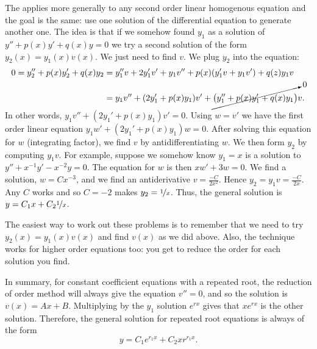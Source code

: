 The \emph{} applies more generally to any second order linear homogenous equation and the goal is the same: use one solution of the differential equation to generate another one.  The idea is that if we somehow found $y_1$ as a solution of
$y'' + p(x) y' + q(x) y = 0$ we try a second
solution of the form $y_2(x) = y_1(x) v(x)$.
We just need to find $v$.  We plug $y_2$ into the equation:
\begin{equation*}
\begin{split}
0 = 
y_2'' + p(x) y_2' + q(x) y_2 & =
y_1'' v + 2 y_1' v' + y_1 v''
+ p(x) ( y_1' v + y_1 v' )
+ q(z) y_1 v
\\
& =
y_1 v''
+ (2 y_1' + p(x) y_1) v'
+
\cancelto{0}{\bigl( y_1'' + p(x) y_1' + q(x) y_1 \bigr)} v .
\end{split}
\end{equation*}
In other words,
$y_1 v'' + (2 y_1' + p(x) y_1) v' = 0$.  Using $w = v'$ we have the
first order linear equation
$y_1 w' + (2 y_1' + p(x) y_1) w = 0$.  After solving this equation for $w$
(integrating factor),
we find $v$ by antidifferentiating $w$.  We then form $y_2$ by computing
$y_1 v$.  For example, suppose we somehow know $y_1 = x$ is a solution
to $y''+x^{-1}y'-x^{-2} y=0$.
The equation for $w$ is then
$xw' + 3 w = 0$.  We find a solution, $w = Cx^{-3}$, and we find an 
antiderivative $v = \frac{-C}{2x^2}$.
Hence $y_2 = y_1 v = \frac{-C}{2x}$.
Any $C$ works and so $C=-2$ makes $y_2 = \nicefrac{1}{x}$.  Thus, the
general solution is $y = C_1 x + C_2\nicefrac{1}{x}$.

The easiest way to work out these problems is to remember that we need to try $y_2(x) =
y_1(x) v(x)$ and find $v(x)$ as we did above.  Also, the technique
works for higher order equations too: you get to reduce the order for each
solution you find. 

In summary, for constant coefficient equations with a repeated root, the reduction of order method will always give the equation $v'' = 0$, and so the solution is $v(x) = Ax + B$. Multiplying by the $y_1$ solution $e^{rx}$ gives that $xe^{rx}$ is the other solution. Therefore, the general solution for repeated root equations is always of the form
\begin{equation*}
y = C_1e^{r_1x} + C_2xr^{r_1x}.
\end{equation*}

